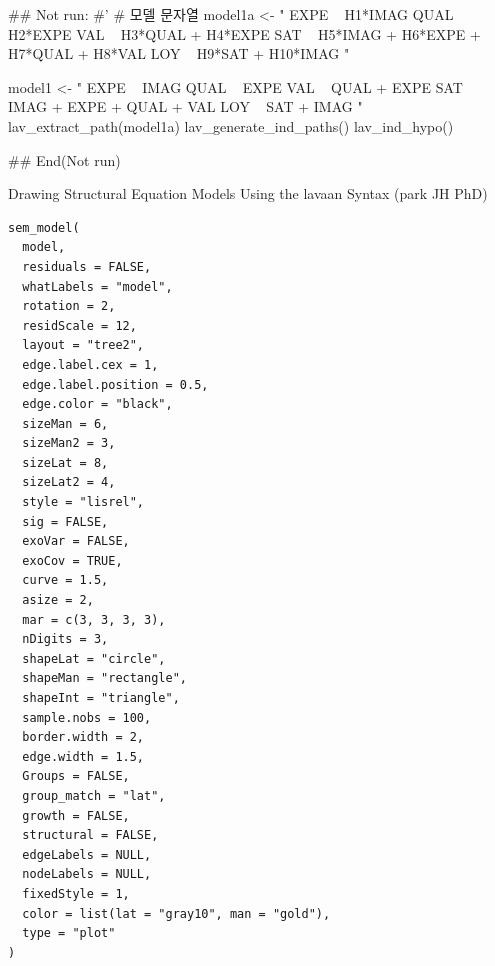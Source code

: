 \documentclass[a4paper]{book}
\begin{document}
%
\begin{Examples}
\begin{ExampleCode}

\#\# Not run: 
#'
# 모델 문자열
model1a <- "
EXPE ~ H1*IMAG
QUAL ~ H2*EXPE
VAL ~ H3*QUAL + H4*EXPE
SAT ~ H5*IMAG + H6*EXPE + H7*QUAL + H8*VAL
LOY ~ H9*SAT + H10*IMAG
"

model1 <- "
EXPE ~ IMAG
QUAL ~ EXPE
VAL ~ QUAL + EXPE
SAT ~ IMAG + EXPE + QUAL + VAL
LOY ~ SAT + IMAG
"
lav_extract_path(model1a)%
  lav_generate_ind_paths() %
  lav_ind_hypo()


## End(Not run)

\end{ExampleCode}
\end{Examples}
%
\begin{Description}
Drawing Structural Equation Models Using the lavaan Syntax (park JH PhD)
\end{Description}
%
\begin{Usage}
\begin{verbatim}
sem_model(
  model,
  residuals = FALSE,
  whatLabels = "model",
  rotation = 2,
  residScale = 12,
  layout = "tree2",
  edge.label.cex = 1,
  edge.label.position = 0.5,
  edge.color = "black",
  sizeMan = 6,
  sizeMan2 = 3,
  sizeLat = 8,
  sizeLat2 = 4,
  style = "lisrel",
  sig = FALSE,
  exoVar = FALSE,
  exoCov = TRUE,
  curve = 1.5,
  asize = 2,
  mar = c(3, 3, 3, 3),
  nDigits = 3,
  shapeLat = "circle",
  shapeMan = "rectangle",
  shapeInt = "triangle",
  sample.nobs = 100,
  border.width = 2,
  edge.width = 1.5,
  Groups = FALSE,
  group_match = "lat",
  growth = FALSE,
  structural = FALSE,
  edgeLabels = NULL,
  nodeLabels = NULL,
  fixedStyle = 1,
  color = list(lat = "gray10", man = "gold"),
  type = "plot"
)
\end{verbatim}
\end{Usage}
%
\end{document}
